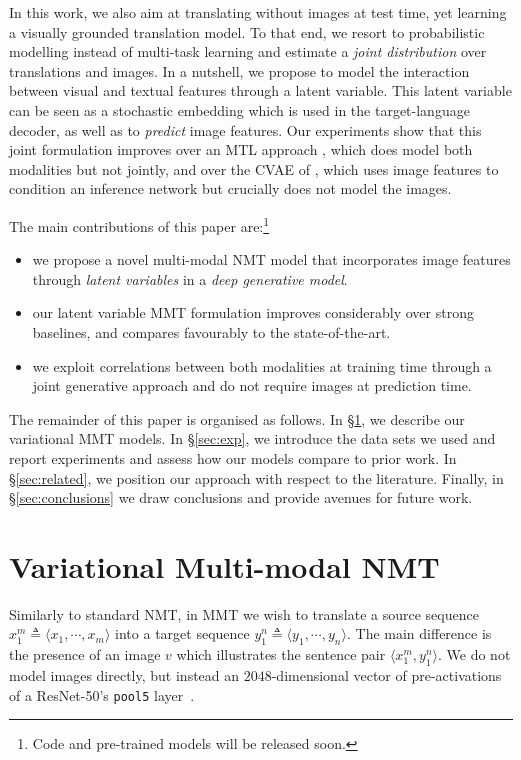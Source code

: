 \documentclass[11pt,a4paper]{article}
\begin{document}
In this work, we also aim at translating without images at test time, yet learning a visually grounded translation model.
To that end, we resort to probabilistic modelling instead of multi-task learning and estimate a \textit{joint distribution} over translations and images.
In a nutshell, we propose to model the interaction between visual and textual features through a latent variable. This latent variable can be seen as a stochastic embedding which is used in the target-language decoder, as well as to \emph{predict} image features. 
Our experiments show that this joint formulation improves over an MTL approach \citep{ElliottKadar2017}, which does model both modalities but not jointly, and over the CVAE of \citet{Toyamaetal2016}, which uses image features to condition an inference network but crucially does not model the images.

The main contributions of this paper are:\footnote{Code and pre-trained models will be released soon.}
\begin{itemize}
  \item we propose a novel multi-modal NMT model that incorporates image features through \emph{latent variables} in a \emph{deep generative model}.
  \item our latent variable MMT formulation improves considerably over strong baselines, and compares favourably to the state-of-the-art.
  \item we exploit correlations between both modalities at training time through a joint generative approach and do not require images at prediction time.
\end{itemize}

The remainder of this paper is organised as follows.
In \S\ref{sec:models}, we describe our variational MMT models.
In \S\ref{sec:exp}, we introduce the data sets we used and report experiments and assess how our models compare to prior work.
In \S\ref{sec:related}, we position our approach with respect to the literature.
Finally, in \S\ref{sec:conclusions} we draw conclusions and provide avenues for future work. 
\section{Variational Multi-modal NMT}\label{sec:models}


Similarly to standard NMT, in MMT we wish to translate a source sequence $x_1^m \triangleq \langle x_1, \cdots, x_m \rangle$ into a target sequence $y_1^n \triangleq \langle y_1, \cdots, y_n \rangle$.
The main difference is the presence of an image $v$ which illustrates the sentence pair $\langle x_1^m, y_1^n \rangle$. We do not model images directly, but instead an $2048$-dimensional vector of pre-activations of a ResNet-50's \texttt{pool5} layer~\cite{He2015}.
\end{document}
